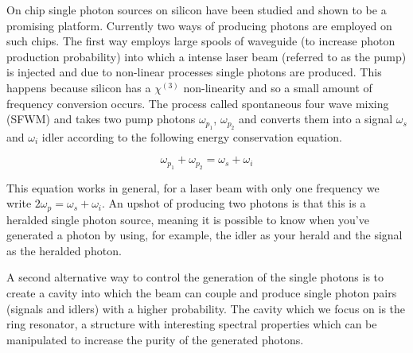 On chip single photon sources on silicon have been studied \cite{silverstone_-chip_2014,engin_photon_2013} and shown to be a promising platform. Currently two ways of producing photons are employed on such chips. The first way employs large spools of waveguide (to increase photon production probability) into which a intense laser beam (referred to as the pump) is injected and due to non-linear processes single photons are produced. This happens because silicon has a $\chi^{(3)}$ non-linearity and so a small amount of frequency conversion occurs. The process called spontaneous four wave mixing (SFWM) and takes two pump photons $\omega_{p_1}$, $\omega_{p_2}$ and converts them into a signal $\omega_s$ and  $\omega_i$ idler according to the following energy conservation equation.

\begin{equation} \label{energyConservation}
\omega_{p_1}+\omega_{p_2}=\omega_s+\omega_i
\end{equation}

This equation works in general, for a laser beam with only one frequency we write $2\omega_p=\omega_s+\omega_i$. An upshot of producing two photons is that this is a heralded single photon source, meaning it is possible to know when you've generated a photon by using, for example, the idler as your herald and the signal as the heralded photon. 

A second alternative way to control the generation of the single photons is to create a cavity into which the beam can couple and produce single photon pairs (signals and idlers) with a higher probability. The cavity which we focus on is the ring resonator, a structure with interesting spectral properties which can be manipulated to increase the purity of the generated photons. 



